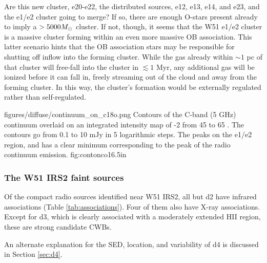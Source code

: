 Are this new cluster, e20-e22, the distributed sources, e12, e13, e14, and e23,
and the e1/e2 cluster going to merge?  If so, there are enough O-stars present
already to imply a $>5000 M_{\odot}$ cluster.  If not, though, it seems that the
W51 e1/e2 cluster is a massive cluster forming within an even more massive OB
association.  This latter scenario hints that the OB association stars may be
responsible for shutting off inflow into the forming cluster.  While the gas
already within $\sim 1$ pc of that cluster will free-fall into the cluster in
$\lesssim 1$ Myr, any additional gas will be ionized before it can fall in,
freely streaming out of the cloud and away from the forming cluster.  In this
way, the cluster's formation would be externally regulated rather than
self-regulated.


\Figure
{figures/diffuse/continuum_on_c18o.png}
{Contours of the C-band (5 GHz) continuum overlaid on an integrated intensity
map of -2 from 45 to 65 \kms \citep{Parsons2012a}.  The contours
go from 0.1 to 10 mJy in 5 logarithmic steps.  The \ceighteeno peaks on the
e1/e2 region, and has a clear minimum corresponding to the peak of the radio
continuum emission.
}
{fig:contonco}{1}{6.5in}

\subsubsection{The W51 IRS2 faint sources}

Of the compact radio sources identified near W51 IRS2, all but d2 have infrared
associations (Table \ref{tab:associations}).  Four of them also have X-ray
associations.  Except for d3, which is clearly associated with a moderately
extended HII region, these are strong candidate CWBs.

An alternate explanation for the SED, location, and variability of d4 is
discussed in Section \ref{sec:d4}.




